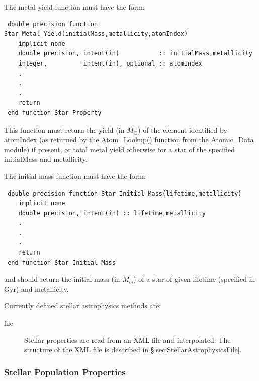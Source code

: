 The metal yield function must have the form:
\begin{verbatim}
 double precision function Star_Metal_Yield(initialMass,metallicity,atomIndex)
    implicit none
    double precision, intent(in)           :: initialMass,metallicity
    integer,          intent(in), optional :: atomIndex
    .
    .
    .
    return
 end function Star_Property
\end{verbatim}
This function must return the yield (in $M_\odot$) of the element identified by {\normalfont \ttfamily atomIndex} (as returned by the \hyperlink{atomic.data.F90:atomic_data:atom_lookup}{{\normalfont \ttfamily Atom\_Lookup()}} function from the \hyperlink{atomic.data.F90:atomic_data}{{\normalfont \ttfamily Atomic\_Data}} module) if present, or total metal yield otherwise for a star of the specified {\normalfont \ttfamily initialMass} and {\normalfont \ttfamily metallicity}.

The initial mass function must have the form:
\begin{verbatim}
 double precision function Star_Initial_Mass(lifetime,metallicity)
    implicit none
    double precision, intent(in) :: lifetime,metallicity
    .
    .
    .
    return
 end function Star_Initial_Mass
\end{verbatim}
and should return the initial mass (in $M_\odot$) of a star of given {\normalfont \ttfamily lifetime} (specified in Gyr) and {\normalfont \ttfamily metallicity}.

Currently defined stellar astrophysics methods are:
\begin{description}
 \item [{\normalfont \ttfamily file}] Stellar properties are read from an XML file and interpolated. The structure of the XML file is described in \S\ref{sec:StellarAstrophysicsFile}.
\end{description}

\subsubsection{Stellar Population Properties}

